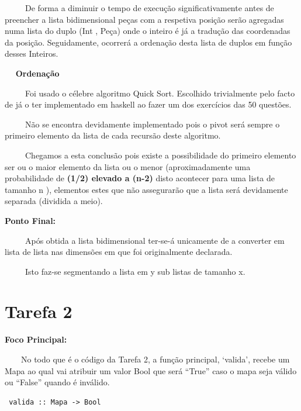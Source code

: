 \documentclass[a4paper]{report} %
\begin{document}
           \par \ \ \ \ \ De forma a diminuir o tempo de execução significativamente antes de preencher a lista bidimensional peças com a respetiva posição serão agregadas numa lista do duplo (Int , Peça) onde o inteiro é já a tradução das coordenadas da posição. Seguidamente, ocorrerá a ordenação desta lista de duplos em função desses Inteiros. 
           \vspace{1.7mm}  
           \par \ \ \textbf{ Ordenação } 
           \par \ \ \ \ \ Foi usado o célebre algoritmo Quick Sort. Escolhido trivialmente pelo facto de já o ter implementado em haskell ao fazer um dos exercícios das 50 questões. 
           \par \ \ \ \ \ Não se encontra devidamente implementado pois o pivot será sempre o primeiro elemento da lista de cada recursão deste algoritmo. 
           \par \ \ \ \ \ Chegamos a esta conclusão pois existe a possibilidade do primeiro elemento ser ou o maior elemento da lista ou o menor (aproximadamente uma probabilidade de \textbf{(1/2) elevado a (n-2)} disto acontecer para uma lista de tamanho n ), elementos estes que não assegurarão que a lista será devidamente separada (dividida a meio). 
           \vspace{4.5mm}  
           \par \textbf{ Ponto Final: } 
           \par \ \ \ \ \ Após obtida a lista bidimensional ter-se-á unicamente de a converter em lista de lista nas dimensões em que foi originalmente declarada. 
           \par \ \ \ \ \ Isto faz-se segmentando a lista em y sub listas de tamanho x. 
         \vspace{19mm}
           
            \section{Tarefa 2}
           
            \vspace{5mm} 
           \par \textbf{ Foco Principal:} 
           \par \ \ \ \ No todo que é o código da Tarefa 2, a função principal, ‘valida’, recebe um Mapa ao qual vai atribuir um valor Bool que será “True” caso o mapa seja válido ou “False” quando é inválido.
           \vspace{1mm}
                            \begin{verbatim}
 valida :: Mapa -> Bool
                            \end{verbatim} 
                            
\end{document}
